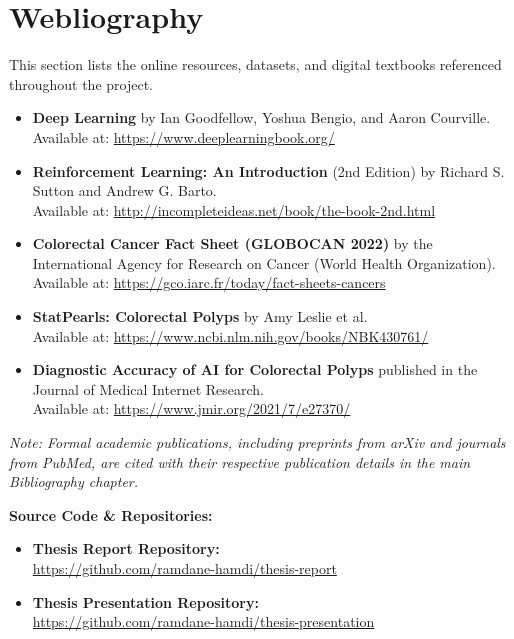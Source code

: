 \chapter*{Webliography}

This section lists the online resources, datasets, and digital textbooks referenced throughout the project.

\begin{itemize}
    \item \textbf{Deep Learning} by Ian Goodfellow, Yoshua Bengio, and Aaron Courville. \\ Available at: \url{https://www.deeplearningbook.org/}
    
    \item \textbf{Reinforcement Learning: An Introduction} (2nd Edition) by Richard S. Sutton and Andrew G. Barto. \\ Available at: \url{http://incompleteideas.net/book/the-book-2nd.html}
    
    \item \textbf{Colorectal Cancer Fact Sheet (GLOBOCAN 2022)} by the International Agency for Research on Cancer (World Health Organization). \\ Available at: \url{https://gco.iarc.fr/today/fact-sheets-cancers}
    
    \item \textbf{StatPearls: Colorectal Polyps} by Amy Leslie et al. \\ Available at: \url{https://www.ncbi.nlm.nih.gov/books/NBK430761/}
    
    \item \textbf{Diagnostic Accuracy of AI for Colorectal Polyps} published in the Journal of Medical Internet Research. \\ Available at: \url{https://www.jmir.org/2021/7/e27370/}
\end{itemize}

\vspace{0.5cm}
\noindent\textit{Note: Formal academic publications, including preprints from arXiv and journals from PubMed, are cited with their respective publication details in the main Bibliography chapter.}

\vspace{0.5cm}
\noindent\textbf{Source Code \& Repositories:}
\begin{itemize}
    \item \textbf{Thesis Report Repository:} \\ \url{https://github.com/ramdane-hamdi/thesis-report}
    \item \textbf{Thesis Presentation Repository:} \\ \url{https://github.com/ramdane-hamdi/thesis-presentation}
\end{itemize}
